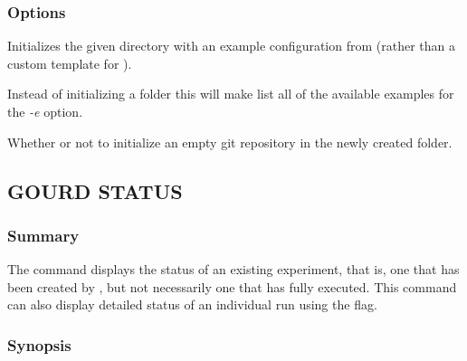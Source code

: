 \documentclass[a4paper,english]{article}
\begin{document}
\begin{adjustwidth}{18pt}{0pt}
            \subsubsection{Options}
                \begin{Description}[Options]
                    \item[\OptArg{-e, \ddash example}{ example-name}]
                      Initializes the given directory with an example configuration from 
                      (rather than a custom template for ).
                    \item[\Opt{\ddash list-examples}]
                      Instead of initializing a folder this will make  list all of the available
                      examples for the \emph{-e} option.
                    \item[\OptArg{\ddash git}{=true|false}]
                      Whether or not to initialize an empty git repository in the newly created folder.
                \end{Description}

        \subsection{GOURD STATUS}

            \subsubsection{Summary}
                The   command displays the status of an existing experiment,
                that is, one that has been created by  , but not necessarily
                one that has fully executed.
                This command can also display detailed status of an individual run using the  flag.

            \subsubsection{Synopsis}
                 


\end{adjustwidth}
\end{document}

